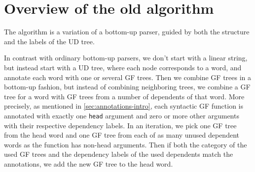 %
%
%
%

\section{Overview of the old algorithm}\label{sec:overview-of-algorithm}

The algorithm is a variation of a bottom-up parser, guided by both the structure and the labels of the UD tree.

In contrast with ordinary bottom-up parsers, we don't start with a linear string, but instead start with a UD tree, where each node corresponds to a word, and annotate each word with one or several GF trees.
Then we combine GF trees in a bottom-up fashion, but instead of combining neighboring trees, we combine a GF tree for a word with GF trees from a number of dependents of that word.
More precisely, as mentioned in \autoref{sec:annotations-intro}, each syntactic GF function is annotated with exactly one \texttt{head} argument and zero or more other arguments with their respective dependency labels. In an iteration, we pick one GF tree from the head word and one GF tree from each of as many unused dependent words as the function has non-head arguments. Then if both the category of the used GF trees and the dependency labels of the used dependents match the annotations, we add the new GF tree to the head word.

